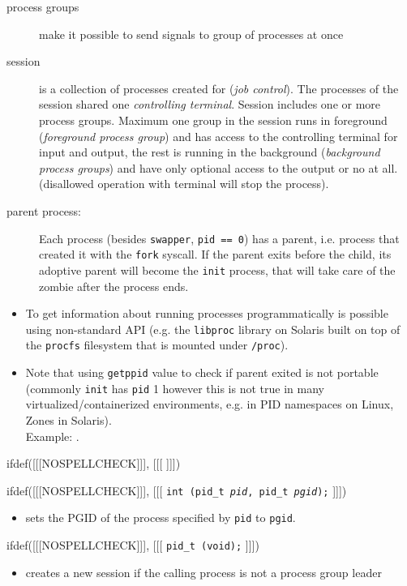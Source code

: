 \begin{description}
\item[process groups] make it possible to send signals to group of processes
at once
\item[session] is a collection of processes created for (\emph{job control}).
The processes of the session shared one \emph{controlling terminal}.
Session includes one or more process groups. Maximum one group in the session
runs in foreground (\emph{foreground process group}) and has access to the
controlling terminal for input and output, the rest is running in the background
(\emph{background process groups}) and have only optional access to the output
or no at all. (disallowed operation with terminal will stop the process).
\item[parent process:] Each process (besides \texttt{swapper},
\texttt{pid~==~0})
has a parent, i.e. process that created it with the \texttt{fork} syscall.
If the parent exits before the child, its adoptive parent will become the
\texttt{init} process, that will take care of the zombie after the process ends.
\end{description}
\begin{itemize}
\item To get information about running processes programmatically is possible
using non-standard API (e.g. the \texttt{libproc} library on Solaris built
on top of the \texttt{procfs} filesystem that is mounted under \texttt{/proc}).
\item Note that using \texttt{getppid} value to check if parent exited is not
portable (commonly \texttt{init} has \texttt{pid} 1 however this is not true in
many virtualized/containerized environments, e.g. in PID namespaces on Linux,
Zones in Solaris).\\
Example: .
\end{itemize}



ifdef([[[NOSPELLCHECK]]], [[[
]]])

\begin{slide}
ifdef([[[NOSPELLCHECK]]], [[[
\texttt{int (pid\_t \emph{pid}, pid\_t \emph{pgid});}
]]])
\begin{itemize}
\item sets the PGID of the process specified by \texttt{pid} to \texttt{pgid}.
\end{itemize}
ifdef([[[NOSPELLCHECK]]], [[[
\texttt{pid\_t (void);}
]]])
\begin{itemize}
\item creates a new session if the calling process is not a process
group leader
\end{itemize}
\end{slide}

